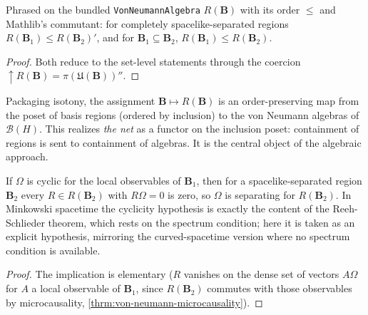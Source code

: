 \begin{theorem}
    \label{thrm:von-neumann-bundled-order}
    \leanok
    Phrased on the bundled \texttt{VonNeumannAlgebra} $R(\mathbf{B})$ with its order $\le$ and Mathlib's commutant: for completely spacelike-separated regions $R(\mathbf{B}_1) \le R(\mathbf{B}_2)'$, and for $\mathbf{B}_1 \subseteq \mathbf{B}_2$, $R(\mathbf{B}_1) \le R(\mathbf{B}_2)$.
\end{theorem}
\begin{proof}
    \leanok
    Both reduce to the set-level statements through the coercion $\uparrow R(\mathbf{B}) = \pi(\mathfrak{U}(\mathbf{B}))''$.
\end{proof}

\begin{definition}
    \label{def:von-neumann-net}
    \leanok
    Packaging isotony, the assignment $\mathbf{B} \mapsto R(\mathbf{B})$ is an order-preserving map from the poset of basis regions (ordered by inclusion) to the von Neumann algebras of $\mathcal{B}(H)$. This realizes \emph{the net} as a functor on the inclusion poset: containment of regions is sent to containment of algebras. It is the central object of the algebraic approach.
\end{definition}

\begin{theorem}
    \label{thrm:statistical-independence}
    \leanok
    If $\Omega$ is cyclic for the local observables of $\mathbf{B}_1$, then for a spacelike-separated region $\mathbf{B}_2$ every $R \in R(\mathbf{B}_2)$ with $R\Omega = 0$ is zero, so $\Omega$ is separating for $R(\mathbf{B}_2)$. In Minkowski spacetime the cyclicity hypothesis is exactly the content of the Reeh-Schlieder theorem, which rests on the spectrum condition; here it is taken as an explicit hypothesis, mirroring the curved-spacetime version where no spectrum condition is available.
\end{theorem}
\begin{proof}
    \leanok
    The implication is elementary ($R$ vanishes on the dense set of vectors $A\Omega$ for $A$ a local observable of $\mathbf{B}_1$, since $R(\mathbf{B}_2)$ commutes with those observables by microcausality, \ref{thrm:von-neumann-microcausality}).
\end{proof}

